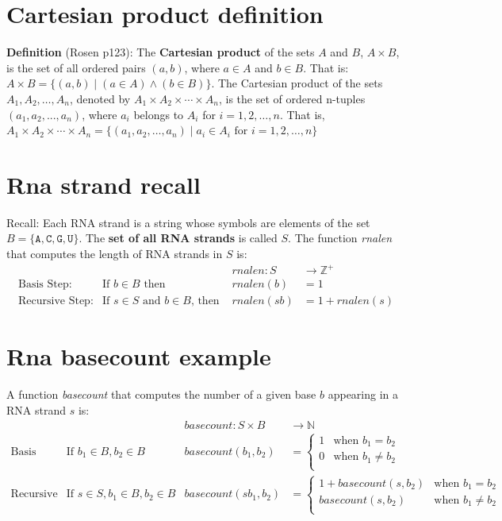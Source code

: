 \documentclass[12pt, oneside]{article}
\newcommand{\A}[0]{\texttt{A}}
\newcommand{\C}[0]{\texttt{C}}
\newcommand{\G}[0]{\texttt{G}}
\newcommand{\U}[0]{\texttt{U}}
\begin{document}
\vfill \vfill
\section*{Cartesian product definition}


{\bf Definition} (Rosen p123): The {\bf Cartesian product} of the sets $A$ and $B$, $A \times B$, is the set of all ordered pairs $(a, b)$, where $a \in A$ and $b \in B$. 
That is: $A \times B = \{(a, b) \mid (a \in A) \land (b \in B)\}.$ The Cartesian product of the sets $A_1, A_2, \ldots ,A_n$, denoted by $A_1 \times A_2 \times \cdots \times A_n$, is the
set of ordered n-tuples $(a_1, a_2,...,a_n)$, where $a_i$ belongs to $A_i$ for $i = 1, 2,\ldots,n$. That is,
$A_1 \times A_2 \times \cdots \times A_n = \{(a_1, a_2,\ldots,a_n) \mid a_i \in A_i \textrm{ for } i = 1, 2,\ldots,n\}$
 \vfill
\section*{Rna strand recall}


Recall: Each RNA strand is a string whose symbols are elements of the set $B  = \{\A, \C, \G, \U \}$.
The {\bf set of all RNA strands} is called $S$.
The function \textit{rnalen} that computes the length of RNA strands in $S$ is:
\[
\begin{array}{llll}
& & \textit{rnalen} : S & \to \mathbb{Z}^+ \\
\textrm{Basis Step:} & \textrm{If } b \in B\textrm{ then } & \textit{rnalen}(b) & = 1 \\
\textrm{Recursive Step:} & \textrm{If } s \in S\textrm{ and }b \in B\textrm{, then  } & \textit{rnalen}(sb) & = 1 + \textit{rnalen}(s)
\end{array}
\] \vfill
\section*{Rna basecount example}


A function \textit{basecount} that computes the number of a given base $b$ appearing in a RNA strand $s$ is:
\[
\begin{array}{llll}
& & \textit{basecount} : S \times B & \to \mathbb{N} \\
\textrm{Basis Step:} &  \textrm{If } b_1 \in B, b_2 \in B & \textit{basecount}(b_1, b_2) & =
        \begin{cases}
            1 & \textrm{when } b_1 = b_2 \\
            0 & \textrm{when } b_1 \neq b_2 \\
        \end{cases} \\
\textrm{Recursive Step:} & \textrm{If } s \in S, b_1 \in B, b_2 \in B &\textit{basecount}(s b_1, b_2) & =
        \begin{cases}
            1 + \textit{basecount}(s, b_2) & \textrm{when } b_1 = b_2 \\
            \textit{basecount}(s, b_2) & \textrm{when } b_1 \neq b_2 \\
        \end{cases}
\end{array}
\]
\end{document}
